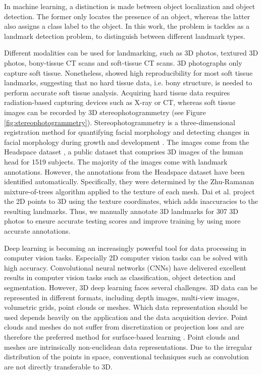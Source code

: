 In machine learning, a distinction is made between object localization and object detection. The former only locates the presence of an object, whereas the latter also assigns a class label to the object. In this work, the problem is tackles as a landmark detection problem, to distinguish between different landmark types.

Different modalities can be used for landmarking, such as 3D photos, textured 3D photos, bony-tissue CT scans and soft-tissue CT scans. 3D photographs only capture soft tissue. Nonetheless, \cite{Plooij2009} showed high reproducibility for most soft tissue landmarks, suggesting that no hard tissue data, i.e. bony structure, is needed to perform accurate soft tissue analysis. Acquiring hard tissue data requires radiation-based capturing devices such as X-ray or CT, whereas soft tissue images can be recorded by 3D stereophotogrammetry (see Figure \ref{fig:stereophotogrammetry}). Stereophotogrammetry is a three-dimensional registration method for quantifying facial morphology and detecting changes in facial morphology during growth and development \cite{Ras1996}.
The images come from the Headspace dataset \cite{Dai2019}, a public dataset that comprises 3D images of the human head for 1519 subjects. The majority of the images come with landmark annotations. However, the annotations from the Headspace dataset have been identified automatically. Specifically, they were determined by the Zhu-Ramanan mixture-of-trees algorithm \cite{Zhu2012} applied to the texture of each mesh. Dai et al. project the 2D points to 3D using the texture coordinates, which adds inaccuracies to the resulting landmarks. Thus, we manually annotate 3D landmarks for 307 3D photos to ensure accurate testing scores and improve training by using more accurate annotations.

Deep learning is becoming an increasingly powerful tool for data processing in computer vision tasks. Especially 2D computer vision tasks can be solved with high accuracy. Convolutional neural networks (CNNs) have delivered excellent results in computer vision tasks such as classification, object detection and segmentation. However, 3D deep learning faces several challenges. 3D data can be represented in different formats, including depth images, multi-view images, volumetric grids, point clouds or meshes. Which data representation should be used depends heavily on the application and the data acquisition device. Point clouds and meshes do not suffer from discretization or projection loss and are therefore the preferred method for surface-based learning \cite{Guo2021}. Point clouds and meshes are intrinsically non-euclidean data representations. Due to the irregular distribution of the points in space, conventional techniques such as convolution are not directly transferable to 3D.

